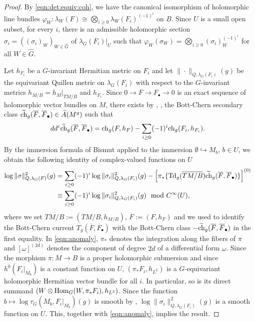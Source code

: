 \documentclass[amscd, leqno]{amsart}
\theoremstyle{plain}
\theoremstyle{definition}
\theoremstyle{remark}
\newenvironment{pf}{\begin{proof}}{\end{proof}}
\begin{document}
\begin{pf}
By \eqref{eqn:det:equiv:coh}, we have the canonical isomorphism of holomorphic line bundles 
$\varphi_{W} \colon \lambda_{W}(F) \cong \bigotimes_{i\geq0}\lambda_{W}(F_{i})^{(-1)^{i}}$ on $B$. 
Since $U$ is a small open subset, for every $i$, there is an admissible holomorphic section 
$\sigma_{i}=(({\sigma}_{i})_{W})_{W\in\widehat{G}}$ of $\lambda_{G}(F_{i})|_{U}$ 
such that $\varphi_{W}(\sigma_{W}) = \bigotimes_{i\geq0}({\sigma}_{i})_{W}^{(-1)^{i}}$ for all $W\in\widehat{G}$. 
\par
Let $h_{F_{i}}$ be a $G$-invariant Hermitian metric on $F_{i}$ and 
let $\|\cdot\|_{Q,\lambda_{G}(F_{i})}(g)$ be the equivariant Quillen metric on $\lambda_{G}(F_{i})$ 
with respect to the $G$-invariant metrics $h_{M/B}=h_{M}|_{TM/B}$ and $h_{F_{i}}$. 
Since $0 \to F \to F_{\bullet} \to 0$ is an exact sequence of holomorphic vector bundles on $M$, 
there exists by \cite[I, f)]{BGS88}, \cite[Sect.\,1.2.3]{GilletSoule90}, \cite[Sect.\,3.3]{KohlerRoessler01} 
the Bott-Chern secondary class $\widetilde{\rm ch}_{g}(\overline{F},\overline{F}_{\bullet})\in\widetilde{A}(M^{g})$ such that
$$
dd^{c}\widetilde{\rm ch}_{g}(\overline{F},\overline{F}_{\bullet}) = {\rm ch}_{g}(F,h_{F}) - \sum_{i\geq0}(-1)^{i}{\rm ch}_{g}(F_{i},h_{F_{i}}).
$$
By the immersion formula of Bismut \cite[Th.\,0.1]{Bismut95} applied to the immersion $\emptyset\hookrightarrow M_{b}$, $b\in U$, 
we obtain the following identity of complex-valued functions on $U$
\begin{equation}
\label{eqn:anomaly}
\begin{aligned}
\log \| \sigma \|_{Q,\lambda_{G}(F)}^{2}(g)
&=
\sum_{i\geq0} (-1)^{i} \log\|\sigma_{i}\|_{Q,\lambda_{G}(F_{i})}^{2}(g)
-
\left[ \pi_{*} \{ {\rm Td}_{g}( \overline{TM/B} ) \widetilde{\rm ch}_{g}( \overline{F}, \overline{F}_{\bullet} ) \} \right]^{(0)}
\\
&\equiv
\sum_{i\geq0} (-1)^{i} \log \| \sigma_{i} \|_{Q,\lambda_{G}(F_{i})}^{2}(g) \mod C^{\infty}(U),
\end{aligned}
\end{equation}
where we set $\overline{TM/B} := (TM/B,h_{M/B})$, $\overline{F} := (F,h_{F})$ and we used \cite[Cor.\,3.10]{KohlerRoessler01} to identify 
the Bott-Chern current $T_{g}(\overline{F},\overline{F}_{\bullet})$ with the Bott-Chern class $-\widetilde{\rm ch}_{g}(\overline{F},\overline{F}_{\bullet})$ in the first equality. In \eqref{eqn:anomaly}, $\pi_{*}$ denotes the integration along the fibers of $\pi$ and $[\omega]^{(2d)}$ denotes the component of degree $2d$ of a differential form $\omega$. 
Since the morphism $\pi\colon M \to B$ is a proper holomorphic submersion and since $h^{0}(F_{i}|_{M_{b}})$ is a constant function on $U$, 
$(\pi_{*}F_{i}, h_{L^{2}})$ is a $G$-equivariant holomorphic Hermitian vector bundle for all $i$. In particular, so is its direct summand
$(W\otimes{\rm Hom}_{G}(W, \pi_{*}F_{i}), h_{L^{2}})$. Since the function $b \mapsto \log \tau_{G}(M_{b},F_{i}|_{M_{b}})(g)$ is smooth by \cite[Th.\,2.12]{Ma00},
$\log \| \sigma_{i} \|_{Q,\lambda_{G}(F_{i})}^{2}(g)$ is a smooth function on $U$. This, together with \eqref{eqn:anomaly}, implies the result.
\end{pf}
\end{document}
